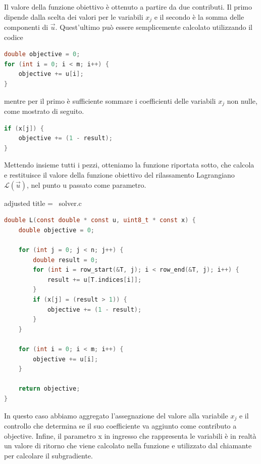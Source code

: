 Il valore della funzione obiettivo è ottenuto a partire da due contributi. Il primo dipende dalla scelta dei valori per
le variabili
\(
    x_j
\)
e il secondo è la somma delle componenti di
\(
    \vec{u}
\). Quest'ultimo può essere semplicemente calcolato utilizzando il codice

\begin{inline}
\begin{lstlisting}[style = style2, language=c]
double objective = 0;
for (int i = 0; i < m; i++) {
    objective += u[i];
}
\end{lstlisting}
\end{inline}
\noindent
mentre per il primo è sufficiente sommare i coefficienti delle variabili \( x_j \) non nulle, come mostrato di seguito.
\begin{inline}
\begin{lstlisting}[style = style2, language=c]
if (x[j]) {
    objective += (1 - result);
}
\end{lstlisting}
\end{inline}
\noindent
Mettendo insieme tutti i pezzi, otteniamo la funzione riportata sotto, che calcola e restituisce il valore della
funzione obiettivo del rilassamento Lagrangiano \( \mathcal{L}(\vec{u}) \), nel punto {\jbm u} passato come parametro.

\begin{code}{adjusted title = {\cicon\ solver.c}}
\begin{lstlisting}[language=c, style = style, caption={Soluzione del rilassamento Lagrangiano.}]
double L(const double * const u, uint8_t * const x) {
    double objective = 0;

    for (int j = 0; j < n; j++) {
        double result = 0;
        for (int i = row_start(&T, j); i < row_end(&T, j); i++) {
            result += u[T.indices[i]];
        }
        if (x[j] = (result > 1)) {
            objective += (1 - result);
        }
    }

    for (int i = 0; i < m; i++) {
        objective += u[i];
    }

    return objective;
}
\end{lstlisting}
\end{code}
\noindent
In questo caso abbiamo aggregato l'assegnazione del valore alla variabile \( x_j \) e il controllo che determina se il
suo coefficiente va aggiunto come contributo a {\jbm objective}.
Infine, il parametro {\jbm x} in ingresso che rappresenta le variabili è in realtà un valore di ritorno che viene
calcolato nella funzione e utilizzato dal chiamante per calcolare il subgradiente.
